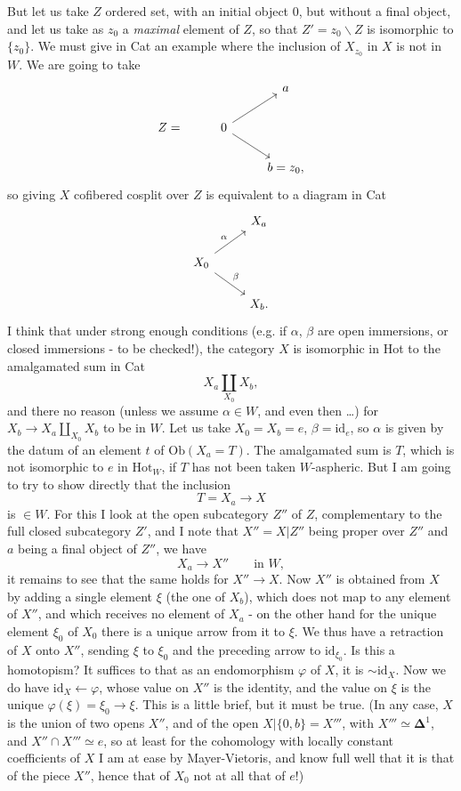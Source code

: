 \documentclass[11pt]{article}
\newcommand{\printedpage}[1]{\marginpar{\footnotesize p.~#1}}
\newcommand{\msp}[1]{\marginpar{\footnotesize [#1]}}
\begin{document}
But let us take $Z$ ordered set, with an initial object $0$, but without a final object, and let us take as $z_0$ a \textit{maximal} element of $Z$, so that $Z' = z_0\backslash Z$ is isomorphic to $\{z_0\}$. We must give in Cat an example where the inclusion of $X_{z_0}$ in $X$ is not in $W$. We are going to take
\printedpage{117}
\[
\begin{tikzcd}
 & & a \\
Z = & 0 \arrow[ur] \arrow[dr] & \\
 & & b = z_0,
\end{tikzcd}
\]
so giving $X$ cofibered cosplit over $Z$ is equivalent to a diagram in Cat
\[
\begin{tikzcd}
 & X_a \\
X_0 \arrow[ur, "\alpha"] \arrow[dr, "\beta"] & \\
 & X_b.
\end{tikzcd}
\]
I think that under strong enough conditions (e.g. if $\alpha$, $\beta$ are open immersions, or closed immersions - to be checked!), the category $X$ is isomorphic in Hot to the amalgamated sum in Cat
\[ X_a{\textstyle\coprod_{X_0}}X_b, \]
and there no reason (unless we assume $\alpha \in W$, and even then \dots) for $X_b \longrightarrow X_a \coprod_{X_0} X_b$ to be in $W$. Let us take $X_0 = X_b = e$, $\beta = \mathrm{id}_e$, so $\alpha$ is given by the datum of an element $t$ of $\mathrm{Ob}(X_a = T)$. The amalgamated sum is $T$, which is not isomorphic to $e$ in $\mathrm{Hot}_W$,
\msp{page 190}
if $T$ has not been taken $W$-aspheric. But I am going to try to show directly that the inclusion
\[ T = X_a \longrightarrow X \]
is $\in W$. For this I look at the open subcategory $Z''$ of $Z$, complementary to the full closed subcategory $Z'$, and I note that $X'' = X|Z''$ being proper over $Z''$ and $a$ being a final object of $Z''$, we have
\[ X_a \longrightarrow X'' \qquad \text{in } W, \]
it remains to see that the same holds for $X'' \longrightarrow X$. Now $X''$ is obtained from $X$ by adding a single element $\xi$ (the one of $X_b$), which does not map to any element of $X''$, and which receives no element of $X_a$ - on the other hand for the unique element $\xi_0$ of $X_0$ there is a unique arrow from it to $\xi$. We thus have a retraction of $X$ onto $X''$, sending $\xi$ to $\xi_0$ and the preceding arrow to $\mathrm{id}_{\xi_0}$. Is this a homotopism? It suffices to that as an endomorphism $\varphi$ of $X$, it is $\sim \mathrm{id}_X$. Now we do have $\mathrm{id}_X \longleftarrow \varphi$, whose value on $X''$ is the identity, and the value on $\xi$ is the unique $\varphi(\xi) = \xi_0 \longrightarrow \xi$. This is a little brief, but it must be true. (In any case, $X$ is the union of two opens $X''$, and of the open $X|\{0,b\} = X'''$, with $X''' \simeq \mathbf{\Delta}^1$, and $X'' \cap X''' \simeq e$, so at least for the cohomology with locally constant coefficients of $X$ I am at ease by Mayer-Vietoris, and know full well that it is that of the piece $X''$, hence that of $X_0$ not at all that of $e$!)
\end{document}
